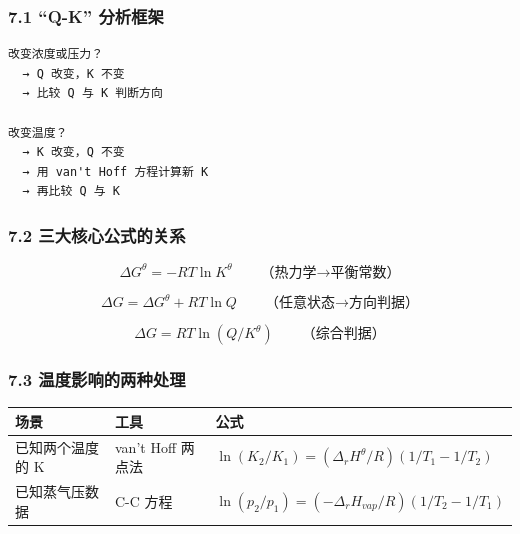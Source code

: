 \subsubsection{7.1 ``Q-K'' 分析框架}\label{q-k-ux5206ux6790ux6846ux67b6}

\begin{verbatim}
改变浓度或压力？
  → Q 改变，K 不变
  → 比较 Q 与 K 判断方向

改变温度？
  → K 改变，Q 不变
  → 用 van't Hoff 方程计算新 K
  → 再比较 Q 与 K
\end{verbatim}

\subsubsection{7.2 三大核心公式的关系}\label{ux4e09ux5927ux6838ux5fc3ux516cux5f0fux7684ux5173ux7cfb}

\[\Delta G^\theta = -RT \ln K^\theta \qquad \text{（热力学→平衡常数）}\]

\[\Delta G = \Delta G^\theta + RT \ln Q \qquad \text{（任意状态→方向判据）}\]

\[\Delta G = RT \ln(Q/K^\theta) \qquad \text{（综合判据）}\]

\subsubsection{7.3 温度影响的两种处理}\label{ux6e29ux5ea6ux5f71ux54cdux7684ux4e24ux79cdux5904ux7406}

{\def\LTcaptype{none} %
\begin{longtable}[]{@{}
  >{\raggedright\arraybackslash}p{}
  >{\raggedright\arraybackslash}p{}
  >{\raggedright\arraybackslash}p{}@{}}
\toprule\noalign{}
\begin{minipage}[b]{\linewidth}\raggedright
场景
\end{minipage} & \begin{minipage}[b]{\linewidth}\raggedright
工具
\end{minipage} & \begin{minipage}[b]{\linewidth}\raggedright
公式
\end{minipage} \\
\midrule\noalign{}
\endhead
\bottomrule\noalign{}
\endlastfoot
已知两个温度的 K & van't Hoff 两点法 & \(\ln(K_2/K_1) = (\Delta_r H^\theta/R)(1/T_1 - 1/T_2)\) \\
已知蒸气压数据 & C-C 方程 & \(\ln(p_2/p_1) = (-\Delta_r H_{vap}/R)(1/T_2 - 1/T_1)\) \\
\end{longtable}
}


